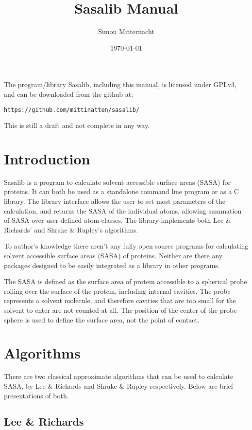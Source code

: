 \documentclass[a4paper,11pt]{article}
\author{Simon Mitternacht}
\date{\today}
\title{Sasalib Manual}
\begin{document}
\maketitle

The program/library Sasalib, including this manual, is licensed under
GPLv3, and can be downloaded from the github at: 
\begin{center}
\texttt{https://github.com/mittinatten/sasalib/}
\end{center}

This is still a draft and not complete in any way.

\newpage
\section{Introduction}

Sasalib is a program to calculate solvent accessible surface areas
(SASA) for proteins. It can both be used as a standalone command line
program or as a C library. The library interface allows the user to
set most parameters of the calculation, and returns the SASA of the
individual atoms, allowing summation of SASA over user-defined
atom-classes. The library implements both Lee \& Richards' and Shrake
\& Rupley's algorithms.

To author's knowledge there aren't any fully open source programs for
calculating solvent accessible surface areas (SASA) of
proteins. Neither are there any packages designed to be easily
integrated as a library in other programs. 

The SASA is defined as the surface area of protein accessible to a
spherical probe rolling over the surface of the protein, including
internal cavities. The probe represents a solvent molecule, and
therefore cavities that are too small for the solvent to enter are not
counted at all. The position of the center of the probe sphere is used
to define the surface area, not the point of contact.

\section{Algorithms}

There are two classical approximate algorithms that can be used to
calculate SASA, by Lee \& Richards and Shrake \& Rupley
respectively. Below are brief presentations of both. 

\subsection{Lee \& Richards}
\end{document}
